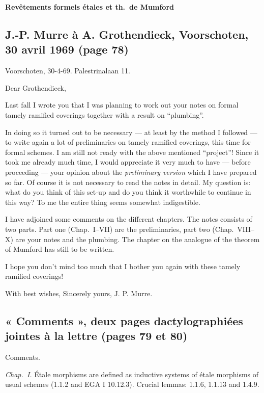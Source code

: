 \documentclass[11pt,a4paper]{article}
\begin{document}

\textbf{Revêtements formels étales et th.\ de Mumford}

\subsection*{J.-P. Murre à A. Grothendieck, Voorschoten, 30 avril 1969 (page 78)}

Voorschoten, 30-4-69. Palestrinalaan 11.

Dear Grothendieck,

Last fall I wrote you that I was planning to work out your notes on formal
tamely ramified coverings together with a result on ``plumbing''.

In doing so it turned out to be necessary --- at least by the method I
followed --- to write again a lot of preliminaries on tamely ramified
coverings, this time for formal schemes. I am still not ready with the above
mentioned ``project''! Since it took me already much time, I would appreciate
it very much to have --- before proceeding --- your opinion about the
\emph{preliminary version} which I have prepared so far. Of course it is not
necessary to read the notes in detail. My question is: what do you think of
this set-up and do you think it worthwhile to continue in this way? To me the
entire thing seems somewhat indigestible.

I have adjoined some comments on the different chapters. The notes consists
of two parts. Part one (Chap.\ I--VII) are the preliminaries, part two (Chap.\
VIII--X) are your notes and the plumbing. The chapter on the analogue of the
theorem of Mumford has still to be written.

I hope you don't mind too much that I bother you again with these tamely
ramified coverings!

With best wishes, Sincerely yours, J. P. Murre.

\subsection*{« Comments », deux pages dactylographiées jointes à la lettre (pages 79 et 80)}

Comments.

\emph{Chap.\ I.} Étale morphisms  are defined as
inductive systems of étale morphisms of usual schemes (1.1.2 and EGA I
10.12.3). Crucial lemmas: 1.1.6, 1.1.13 and 1.4.9.
\end{document}

